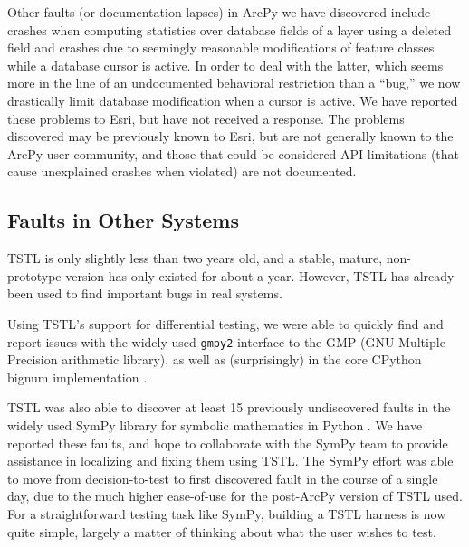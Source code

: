 Other faults (or documentation lapses) in ArcPy we have discovered include crashes when computing
statistics over database fields of a layer using a deleted field and
crashes due to seemingly reasonable modifications of feature classes
while a database cursor is active.  In order to deal with the latter,
which seems more in the line of an undocumented behavioral restriction
than a ``bug,'' we now drastically limit database modification when a
cursor is active.  We have reported these problems to Esri, but have
not received a response.  The problems discovered may be previously
known to Esri, but are not generally known to the ArcPy user
community, and those that could be considered API limitations (that
cause unexplained crashes when violated) are not documented.

\subsection{Faults in Other Systems}

TSTL  is only slightly less than two years old, and a stable, mature,
non-prototype version has only existed for about a year.   However,
TSTL has already been used to find important bugs in real systems.

Using TSTL's support for differential testing, we were able to 
quickly find 
and report issues with the widely-used {\tt gmpy2} interface to the GMP (GNU 
Multiple Precision \cite{gmp} arithmetic library), as well as 
(surprisingly) in the core CPython bignum implementation
\cite{gmpy2bugs,cpythonbug}. 


TSTL was also able to discover at least 15
previously undiscovered faults in the widely used SymPy library for
symbolic mathematics in Python \cite{sympy}.  We have reported these
faults, and hope to collaborate with the SymPy team to provide
assistance in localizing and fixing them using TSTL.  The SymPy
effort was able to move from
decision-to-test to first discovered fault in the course of a single
day, due to the much higher ease-of-use for the post-ArcPy version of
TSTL used.  For a straightforward testing task like SymPy, building a
TSTL harness is now quite simple, largely a matter of thinking about
what the user wishes to test.

